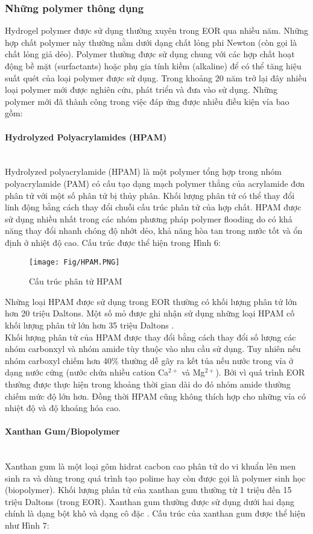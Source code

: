 \documentclass[12pt,a4paper]{article}
\newcommand{\subsubsubsection}[1]{\paragraph{#1}\mbox{}\\}
\begin{document}
	\subsubsection{Những polymer thông dụng}
	Hydrogel polymer được sử dụng thường xuyên trong EOR qua nhiều năm. Những hợp chất polymer này thường nằm dưới dạng chất lỏng phi Newton (còn gọi là chất lỏng giả dẻo). Polymer thường được sử dụng chung với các hợp chất hoạt động bề mặt (surfactants) hoặc phụ gia tính kiềm (alkaline) để có thể tăng hiệu suất quét của loại polymer được sử dụng. Trong khoảng 20 năm trở lại đây nhiều loại polymer mới được nghiên cứu, phát triển và đưa vào sử dụng. Những polymer mới đã thành công trong việc đáp ứng được nhiều điều kiện vỉa bao gồm:
	\subsubsubsection{Hydrolyzed Polyacrylamides (HPAM)}
	Hydrolyzed polyacrylamide (HPAM) là một polymer tổng hợp trong nhóm polyacrylamide (PAM) có cấu tạo dạng mạch polymer thẳng của acrylamide đơn phân tử với một số phân tử bị thủy phân. Khối lượng phân tử có thể thay đổi linh động bằng cách thay đổi chuỗi cấu trúc phân tử của hợp chất. HPAM được sử dụng nhiều nhất trong các nhóm phương pháp polymer flooding do có khả năng thay đổi nhanh chóng độ nhớt dẻo, khả năng hòa tan trong nước tốt và ổn định ở nhiệt độ cao. Cấu trúc  được thể hiện trong Hình 6:
	\begin{figure}[h]
		\centering
		\texttt{[image: Fig/HPAM.PNG]}
		\caption{Cấu trúc phân tử HPAM \cite{sheng2010modern}}
	\end{figure}
	\newline
	Những loại HPAM được sử dụng trong EOR thường có khối lượng phân tử lớn hơn 20 triệu Daltons. Một số mỏ được ghi nhận sử dụng những loại HPAM cố khối lượng phân tử lớn hơn 35 triệu Daltons \cite{sheng2010modern}.\\
	Khối lượng phân tử của HPAM được thay đổi bằng cách thay đổi số lượng các nhóm carbonxyl và nhóm amide tùy thuộc vào nhu cầu sử dụng. Tuy nhiên nếu nhóm carboxyl chiếm hơn 40$\%$ thường dễ gây ra kết tủa nếu nước trong vỉa ở dạng nước cứng (nước chứa nhiều cation Ca$^{2+}$ và Mg$^{2+}$). Bởi vì quá trình EOR thường được thực hiện trong khoảng thời gian dài do đó nhóm amide thường chiếm mức độ lớn hơn. Đồng thời HPAM cũng không thích hợp cho những vỉa có nhiệt độ và độ khoáng hóa cao. 
	\subsubsubsection{Xanthan Gum/Biopolymer}
	Xanthan gum là một loại gôm hidrat cacbon cao phân tử do vi khuẩn lên men sinh ra và dùng trong quá trình tạo polime hay còn được gọi là polymer sinh học (biopolymer). Khối lượng phân tử của xanthan gum thường từ 1 triệu đến 15 triệu Daltons (trong EOR). Xanthan gum thường được sử dụng dưới hai dạng chính là dạng bột khô và dạng cô đặc \cite{sheng2010modern}. Cấu trúc của xanthan gum được thể hiện như Hình 7:
\end{document}
